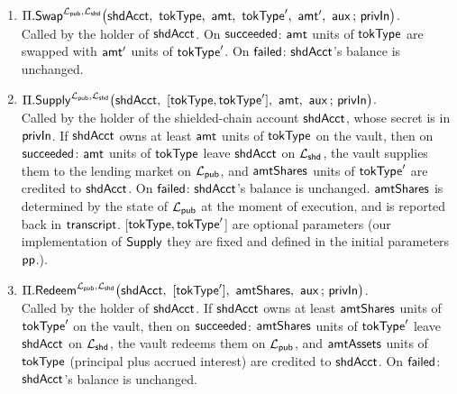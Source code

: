 \begin{definition}
\begin{enumerate}[leftmargin=1.8em,itemsep=6pt]
  \item $\Pi.\Swap^{\Lpub, \Lshd}\bigl(\shdAcct\bc \tokType\bc \amt\bc
    \tokTypeB\bc \amtB\bc \auxx \,;\, \privIn\bigr)$.\\
  Called by the holder of $\mathsf{shdAcct}$. On $\mathsf{succeeded}$: $\mathsf{amt}$ units of $\mathsf{tokType}$ are swapped with $\mathsf{amt}'$ units  of $\mathsf{tokType}'$.
  On $\mathsf{failed}$: $\mathsf{shdAcct}$'s balance is unchanged.



\item $\Pi.\Supply^{\Lpub, \Lshd}\bigl(\shdAcct\bc [\tokType,\tokTypeB]\bc \amt\bc \auxx \,;\, \privIn\bigr)$.\\
  Called by the holder of the shielded-chain account $\mathsf{shdAcct}$, whose secret is in $\mathsf{privIn}$.
  If $\mathsf{shdAcct}$ owns at least $\mathsf{amt}$ units of $\mathsf{tokType}$ on the vault, then on $\mathsf{succeeded}$:
  $\mathsf{amt}$ units of $\mathsf{tokType}$ leave $\mathsf{shdAcct}$ on $\mathcal{L}_{\mathsf{shd}}$, the vault supplies them to the lending
  market on $\mathcal{L}_{\mathsf{pub}}$, and $\mathsf{amtShares}$ units of $\mathsf{tokType}'$ are credited to $\mathsf{shdAcct}$.
  On $\mathsf{failed}$: $\mathsf{shdAcct}$'s balance is unchanged.
  \smallskip
  $\mathsf{amtShares}$ is determined by the state of
  $\mathcal{L}_{\mathsf{pub}}$ at the moment of execution,  and
  is reported back in $\mathsf{transcript}$.
  [$\mathsf{tokType},\mathsf{tokType}'$] are optional parameters (our implementation of $\mathsf{Supply}$ they are fixed and defined in the initial parameters $\mathsf{pp}$.).

\item $\Pi.\Redeem^{\Lpub, \Lshd}\bigl(\shdAcct\bc [\tokType']\bc \amtShares\bc \auxx
      \,;\, \privIn\bigr)$.\\
  Called by the holder of $\mathsf{shdAcct}$. If $\mathsf{shdAcct}$ owns at least $\mathsf{amtShares}$ units of
  $\mathsf{tokType}'$ on the vault, then on $\mathsf{succeeded}$: $\mathsf{amtShares}$ units of $\mathsf{tokType}'$
  leave $\mathsf{shdAcct}$ on $\mathcal{L}_{\mathsf{shd}}$, the vault redeems them on $\mathcal{L}_{\mathsf{pub}}$, and $\mathsf{amtAssets}$ units of
  $\mathsf{tokType}$  (principal plus accrued interest) are credited to $\mathsf{shdAcct}$.
  On $\mathsf{failed}$: $\mathsf{shdAcct}$'s balance is unchanged.
\end{enumerate}
\end{definition}


